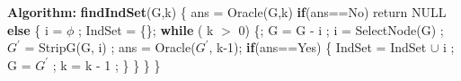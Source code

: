 \documentclass{article}
\newcommand\algo{\vspace{.10in}\textbf{Algorithm: }}
\begin{document}
\algo \newline
	\textbf {findIndSet}(G,k) \{ \newline
	\hspace*{0.5cm} ans = Oracle(G,k) \newline
	\hspace*{0.5cm} \textbf {if}(ans==No) return NULL \newline
	\hspace*{0.5cm} \textbf {else} \{ \newline
	\hspace*{1cm}		i = $\phi$ ; IndSet = \{\}; \newline
	\hspace*{1cm}		\textbf {while} ( k $>$ 0) \{; \newline
	\hspace*{1.5cm}			G = G - i ; \newline
	\hspace*{1.5cm}			i  = SelectNode(G) ; \newline
	\hspace*{1.5cm}			$G^\prime$ = StripG(G, i) ; \newline
	\hspace*{1.5cm}			ans = Oracle($G^\prime$, k-1); \newline
	\hspace*{1.5cm}			\textbf {if}(ans==Yes) \{ \newline
	\hspace*{2cm}				IndSet = IndSet $\cup$ i ; \newline
	\hspace*{2cm}				G = $G^\prime$ ; \newline
	\hspace*{2cm}				k = k - 1 ;  \newline
	\hspace*{1.5cm}			\} \newline
	\hspace*{1cm}		\} \newline
	\hspace*{0.5cm}	\} \newline
	\} \newline
\end{document}

